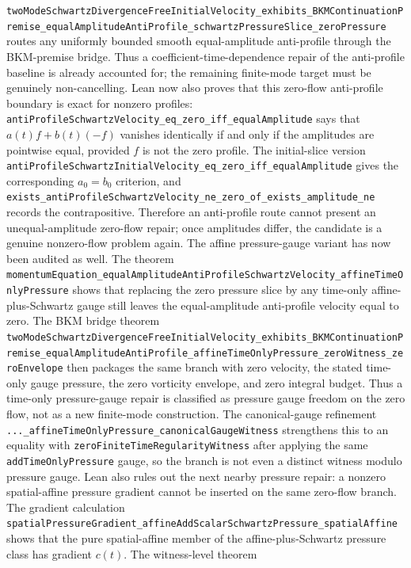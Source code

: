\documentclass[11pt]{article}
\begin{document}
\texttt{twoModeSchwartzDivergenceFreeInitialVelocity\_exhibits\_BKMContinuationPremise\_equalAmplitudeAntiProfile\_schwartzPressureSlice\_zeroPressure}
routes any uniformly bounded smooth equal-amplitude anti-profile through the
BKM-premise bridge.  Thus a coefficient-time-dependence repair of the
anti-profile baseline is already accounted for; the remaining finite-mode
target must be genuinely non-cancelling.
Lean now also proves that this zero-flow anti-profile boundary is exact for
nonzero profiles:
\texttt{antiProfileSchwartzVelocity\_eq\_zero\_iff\_equalAmplitude} says that
\(a(t)f+b(t)(-f)\) vanishes identically if and only if the amplitudes are
pointwise equal, provided \(f\) is not the zero profile.  The initial-slice
version
\texttt{antiProfileSchwartzInitialVelocity\_eq\_zero\_iff\_equalAmplitude}
gives the corresponding \(a_0=b_0\) criterion, and
\texttt{exists\_antiProfileSchwartzVelocity\_ne\_zero\_of\_exists\_amplitude\_ne}
records the contrapositive.  Therefore an anti-profile route cannot present an
unequal-amplitude zero-flow repair; once amplitudes differ, the candidate is a
genuine nonzero-flow problem again.
The affine pressure-gauge variant has now been audited as well.  The theorem
\texttt{momentumEquation\_equalAmplitudeAntiProfileSchwartzVelocity\_affineTimeOnlyPressure}
shows that replacing the zero pressure slice by any time-only
affine-plus-Schwartz gauge still leaves the equal-amplitude anti-profile
velocity equal to zero.  The BKM bridge theorem
\texttt{twoModeSchwartzDivergenceFreeInitialVelocity\_exhibits\_BKMContinuationPremise\_equalAmplitudeAntiProfile\_affineTimeOnlyPressure\_zeroWitness\_zeroEnvelope}
then packages the same branch with zero velocity, the stated time-only gauge
pressure, the zero vorticity envelope, and zero integral budget.  Thus a
time-only pressure-gauge repair is classified as pressure gauge freedom on the
zero flow, not as a new finite-mode construction.  The canonical-gauge
refinement
\texttt{...\_affineTimeOnlyPressure\_canonicalGaugeWitness} strengthens this to
an equality with \texttt{zeroFiniteTimeRegularityWitness} after applying the same
\texttt{addTimeOnlyPressure} gauge, so the branch is not even a distinct witness
modulo pressure gauge.
Lean also rules out the next nearby pressure repair: a nonzero spatial-affine
pressure gradient cannot be inserted on the same zero-flow branch.  The gradient
calculation
\texttt{spatialPressureGradient\_affineAddScalarSchwartzPressure\_spatialAffine}
shows that the pure spatial-affine member of the affine-plus-Schwartz pressure
class has gradient \(c(t)\).  The witness-level theorem
\end{document}
